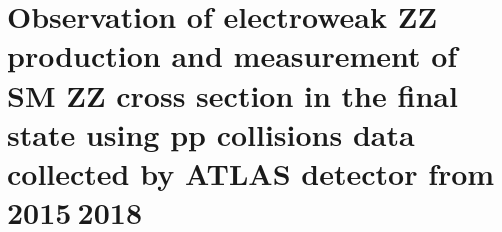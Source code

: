 \chapter{Observation of electroweak ZZ production and measurement of SM ZZ cross section in the \llll final state using pp collisions data collected by ATLAS detector from 2015$~$2018}










\clearpage

